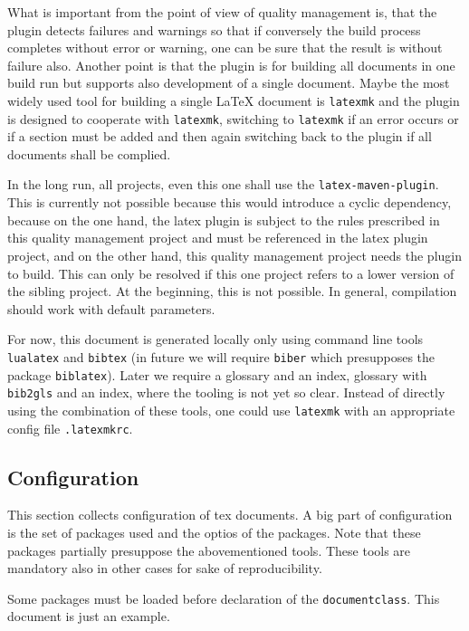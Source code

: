 \documentclass[a4paper,12pt]{article}
\begin{document}
What is important from the point of view of quality management is, 
that the plugin detects failures and warnings so 
that if conversely the build process completes without error or warning, 
one can be sure that the result is without failure also. 
Another point is that the plugin is for building all documents in one build run 
but supports also development of a single document. 
Maybe the most widely used tool for building a single \LaTeX{} document 
is \texttt{latexmk} and the plugin is designed to cooperate with \texttt{latexmk}, 
switching to \texttt{latexmk} if an error occurs or if a section must be added 
and then again switching back to the plugin if all documents shall be complied. 



In the long run, 
all projects, even this one shall use the \texttt{latex-maven-plugin}. 
This is currently not possible because this would introduce a cyclic dependency, 
because on the one hand, the latex plugin is subject to the rules 
prescribed in this quality management project and must be referenced in the latex plugin project, 
and on the other hand, this quality management project needs the plugin to build. 
This can only be resolved if this one project refers to a lower version of the sibling project. 
At the beginning, this is not possible. 
In general, compilation should work with default parameters. 

For now, this document is generated locally 
only using command line tools \texttt{lualatex} and \texttt{bibtex} 
(in future we will require \texttt{biber} which presupposes the package \texttt{biblatex}). 
Later we require a glossary and an index, glossary with \texttt{bib2gls} 
and an index, where the tooling is not yet so clear. 
Instead of directly using the combination of these tools, 
one could use \texttt{latexmk} with an appropriate config file \texttt{.latexmkrc}. 

\subsection{Configuration}\label{subsec:toolConf}

This section collects configuration of tex documents. 
A big part of configuration is the set of packages used 
and the optios of the packages. 
Note that these packages partially presuppose the abovementioned tools. 
These tools are mandatory also in other cases for sake of reproducibility. 

Some packages must be loaded before declaration of the \texttt{documentclass}. 
This document is just an example. 
\end{document}
